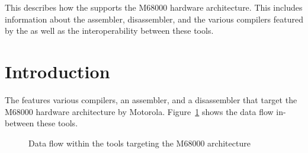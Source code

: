 




\renewcommand{\seemabk}{}

{This \documentation{} describes how the \ecs{} supports the M68000 hardware architecture.
This includes information about the assembler, disassembler, and the various compilers featured by the \ecs{} as well as the interoperability between these tools.}

\section{Introduction}

The \ecs{} features various compilers, an assembler, and a disassembler that target the M68000 hardware architecture by Motorola.
Figure~\ref{fig:m68kdataflow} shows the data flow in-between these tools.

\begin{figure}
\caption{Data flow within the tools targeting the M68000 architecture}
\label{fig:m68kdataflow}
\end{figure}

